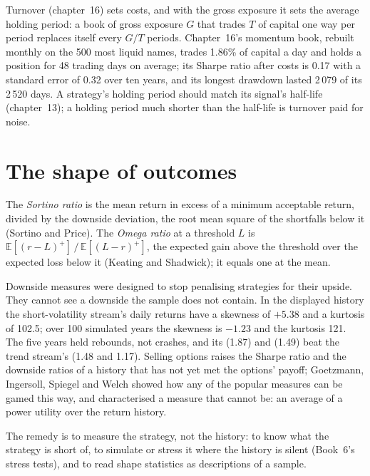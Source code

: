 Turnover (chapter~16) sets costs, and with the gross exposure it sets the average holding period: a book of gross exposure $G$ that trades $T$ of capital one
way per period replaces itself every $G/T$ periods. Chapter~16's momentum book, rebuilt monthly on the 500 most liquid names, trades 1.86\% of capital a day and
holds a position for 48 trading days on average; its Sharpe ratio after costs is 0.17 with a standard error of 0.32 over ten years, and its longest drawdown lasted 2\,079 of its
2\,520 days. A strategy's holding period should match its signal's half-life (chapter~13); a holding period much shorter than the half-life is
turnover paid for noise.

\section{The shape of outcomes}

\begin{definition}\label{def:rs:performance-measurement:sortino}
The \emph{Sortino ratio} is the mean return in excess of a minimum acceptable return, divided by the downside deviation, the root mean square
of the shortfalls below it (Sortino and Price). The \emph{Omega ratio} at a threshold $L$ is $\mathbb{E}[(r-L)^+]\,/\,\mathbb{E}[(L-r)^+]$,
the expected gain above the threshold over the expected loss below it (Keating and Shadwick); it equals one at the mean.
\end{definition}

Downside measures were designed to stop penalising strategies for their upside. They cannot see a downside the sample does not contain. In the displayed history
the short-volatility stream's daily returns have a skewness of $+5.38$ and a kurtosis of 102.5; over 100 simulated years the skewness is $-1.23$ and the kurtosis
121. The five years held rebounds, not crashes, and its  (1.87) and  (1.49) beat the trend stream's (1.48 and 1.17). Selling options
raises the Sharpe ratio and the downside ratios of a history that has not yet met the options' payoff; Goetzmann, Ingersoll, Spiegel and Welch showed how any
of the popular measures can be gamed this way, and characterised a measure that cannot be: an average of a power utility over the return history.

The remedy is to measure the strategy, not the history: to know what the strategy is short of, to simulate or stress it where the history is silent (Book~6's
stress tests), and to read shape statistics as descriptions of a sample.


